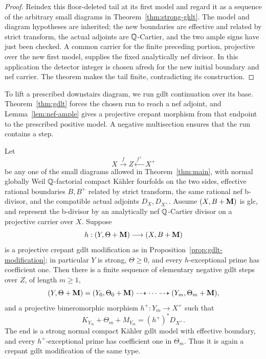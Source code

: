 \begin{proof}
Reindex this floor-deleted tail at its first model and regard it as a
sequence of the arbitrary small diagrams in Theorem~\ref{thm:strong-gklt}.
The model and diagram hypotheses are inherited; the new boundaries are
effective and related by strict transform, the actual adjoints are
\(\mathbb{Q}\)-Cartier, and the two ample signs have just been checked.  A common
carrier for the finite preceding portion, projective over the new first
model, supplies the fixed analytically nef divisor.  In this application
the detector integer is chosen afresh for the new initial boundary and
nef carrier.  The theorem makes the tail finite, contradicting its
construction.
\end{proof}

To lift a prescribed downstairs diagram, we run gdlt continuation over
its base.  Theorem~\ref{thm:gdlt} forces the chosen run to reach a nef
adjoint, and Lemma~\ref{lem:nef-ample} gives a projective crepant morphism
from that endpoint to the prescribed positive model.  A negative
multisection ensures that the run contains a step.

\begin{lemma}\label{lem:nonempty-lift}
Let
\[
 X\xrightarrow{\ f\ }Z\xleftarrow{\ f^+\ }X^+
\]
be any one of the small diagrams allowed in Theorem~\ref{thm:main}, with
normal globally Weil \(\mathbb{Q}\)-factorial compact K\"ahler fourfolds on the two
sides, effective rational boundaries \(B,B^+\) related by strict transform,
the same rational nef b-divisor, and the compatible actual adjoints
\(D_X,D_{X^+}\).  Assume \((X,B+\mathbf{M})\) is glc, and represent the b-divisor
by an analytically nef \(\mathbb{Q}\)-Cartier divisor on a projective carrier over
\(X\).  Suppose
\[
 h:(Y,\Theta+\mathbf{M})\longrightarrow(X,B+\mathbf{M})
\]
is a projective crepant gdlt modification as in
Proposition~\ref{prop:gdlt-modification}; in particular \(Y\) is strong,
\(\Theta\geq0\), and every \(h\)-exceptional prime has coefficient one.
Then there is a finite sequence of elementary negative gdlt steps over
\(Z\), of length \(m\geq1\),
\[
 (Y,\Theta+\mathbf{M})=(Y_0,\Theta_0+\mathbf{M})
 \dashrightarrow\cdots\dashrightarrow(Y_m,\Theta_m+\mathbf{M}),
\]
and a projective bimeromorphic morphism \(h^+:Y_m\to X^+\) such that
\[
 K_{Y_m}+\Theta_m+M_{Y_m}=(h^+)^*D_{X^+}.
\]
The end is a strong normal compact K\"ahler gdlt model with effective
boundary, and every \(h^+\)-exceptional prime has coefficient one in
\(\Theta_m\).  Thus it is again a crepant gdlt modification of the same
type.
\end{lemma}

